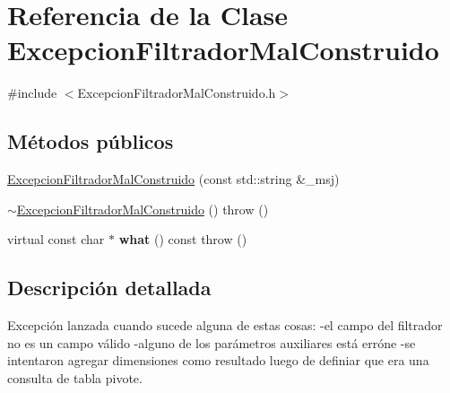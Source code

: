 \hypertarget{classExcepcionFiltradorMalConstruido}{\section{\-Referencia de la \-Clase \-Excepcion\-Filtrador\-Mal\-Construido}
\label{classExcepcionFiltradorMalConstruido}
}


{\ttfamily \#include $<$\-Excepcion\-Filtrador\-Mal\-Construido.\-h$>$}

\subsection*{\-Métodos públicos}
\begin{DoxyCompactItemize}
\item 
\hyperlink{classExcepcionFiltradorMalConstruido_a546de95561b50667557e8d54fe41b3cc}{\-Excepcion\-Filtrador\-Mal\-Construido} (const std\-::string \&\-\_\-msj)
\item 
\hyperlink{classExcepcionFiltradorMalConstruido_a513de8bd97e70b28e906e5820d4d6ef9}{$\sim$\-Excepcion\-Filtrador\-Mal\-Construido} ()  throw ()
\item 
\hypertarget{classExcepcionFiltradorMalConstruido_a93babdb361cd89dc70e42cfb86469e04}{virtual const char $\ast$ {\bfseries what} () const   throw ()}\label{classExcepcionFiltradorMalConstruido_a93babdb361cd89dc70e42cfb86469e04}

\end{DoxyCompactItemize}


\subsection{\-Descripción detallada}
\-Excepción lanzada cuando sucede alguna de estas cosas\-: -\/el campo del filtrador no es un campo válido -\/alguno de los parámetros auxiliares está erróne -\/se intentaron agregar dimensiones como resultado luego de definiar que era una consulta de tabla pivote. 

